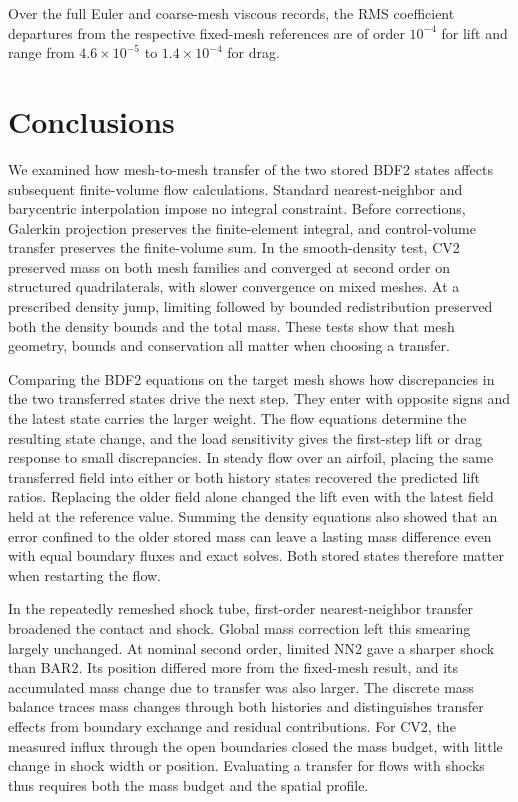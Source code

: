 \documentclass[a4paper,fleqn]{cas-sc}
\begin{document}
Over the full Euler and coarse-mesh viscous records, the RMS coefficient departures from the respective fixed-mesh references are of order $10^{-4}$ for lift and range from $4.6\times10^{-5}$ to $1.4\times10^{-4}$ for drag.


\FloatBarrier
\section{Conclusions}
\label{sec:conclusions}

We examined how mesh-to-mesh transfer of the two stored BDF2 states affects subsequent finite-volume flow calculations. Standard nearest-neighbor and barycentric interpolation impose no integral constraint. Before corrections, Galerkin projection preserves the finite-element integral, and control-volume transfer preserves the finite-volume sum. In the smooth-density test, CV2 preserved mass on both mesh families and converged at second order on structured quadrilaterals, with slower convergence on mixed meshes. At a prescribed density jump, limiting followed by bounded redistribution preserved both the density bounds and the total mass. These tests show that mesh geometry, bounds and conservation all matter when choosing a transfer.

Comparing the BDF2 equations on the target mesh shows how discrepancies in the two transferred states drive the next step. They enter with opposite signs and the latest state carries the larger weight. The flow equations determine the resulting state change, and the load sensitivity gives the first-step lift or drag response to small discrepancies. In steady flow over an airfoil, placing the same transferred field into either or both history states recovered the predicted lift ratios. Replacing the older field alone changed the lift even with the latest field held at the reference value. Summing the density equations also showed that an error confined to the older stored mass can leave a lasting mass difference even with equal boundary fluxes and exact solves. Both stored states therefore matter when restarting the flow.

In the repeatedly remeshed shock tube, first-order nearest-neighbor transfer broadened the contact and shock. Global mass correction left this smearing largely unchanged. At nominal second order, limited NN2 gave a sharper shock than BAR2. Its position differed more from the fixed-mesh result, and its accumulated mass change due to transfer was also larger. The discrete mass balance traces mass changes through both histories and distinguishes transfer effects from boundary exchange and residual contributions. For CV2, the measured influx through the open boundaries closed the mass budget, with little change in shock width or position. Evaluating a transfer for flows with shocks thus requires both the mass budget and the spatial profile.
\end{document}
